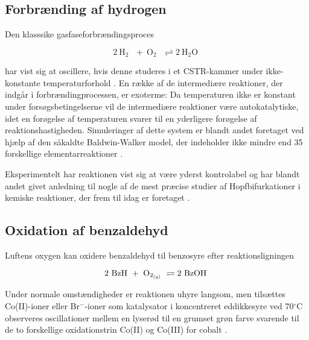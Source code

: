 \subsection{Forbr{\ae}nding af hydrogen}
{
\newcommand{\oxy}    {\mbox{O$_2$ }}
\newcommand{\htoo}  {\mbox{H$_2$O }}
\newcommand{\brint}  {\mbox{H$_2$ }}
Den klasssike gasfaseforbr{\ae}ndingsproces 

\begin{equation}
  2~\brint +~\oxy \rightleftharpoons 2~\htoo
\end{equation}

har vist sig at oscillere, hvis denne studeres i et
CSTR-kammer under ikke-konstante temperaturforhold
\cite{HydrogenOxygen1}. En r{\ae}kke af de intermedi{\ae}re
reaktioner, der indg{\aa}r i forbr{\ae}ndingprocessen, er
exoterme: Da temperaturen ikke er konstant under
fors{\o}gsbetingelserne vil de intermedi{\ae}re
reaktioner v{\ae}re autokatalytiske, idet en for{\o}gelse
af temperaturen svarer til en yderligere for{\o}gelse af
reaktionshastigheden. Simuleringer af dette system er
blandt andet foretaget ved hj{\ae}lp af den s{\aa}kaldte
Baldwin-Walker model, der indeholder ikke mindre end 35
forskellige elementarreaktioner \cite{HydrogenOxygen1}.

\vspace{4.0mm}
Eksperimentelt har reaktionen vist sig at v{\ae}re yderst
kontrolabel og har blandt andet givet anledning til nogle
af de mest pr{\ae}cise studier af Hopfbifurkationer i
kemiske reaktioner, der frem til idag er foretaget
\cite{HydrogenOxygen2}.
}

\subsection{Oxidation af benzaldehyd}
{
\newcommand{\benzal} {\mbox{BzH }}
\newcommand{\benzso} {\mbox{BzOH }}
\newcommand{\oxy}    {\mbox{O$_{2_{{\rm (g)}}}$ }}
Luftens oxygen kan oxidere benzaldehyd til benzosyre efter
reaktionsligningen

\begin{equation}
 2~\benzal +~\oxy \rightleftharpoons 2~\benzso
\end{equation}

Under normale omst{\ae}ndigheder er reaktionen uhyre
langsom, men til\-s{\ae}ttes Co(II)-ioner eller
Br$^-$-ioner som katalysator i koncentreret eddikkesyre ved
70$^\circ$C observeres oscillationer mellem en lyser{\o}d
til en grumset gr{\o}n farve svarende til de to forskellige
oxidationstrin Co(II) og Co(III) for cobalt
\cite{BenzAldehyd}. }

